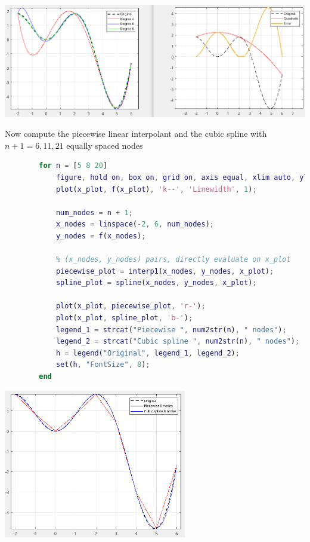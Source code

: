         \begin{center}
            \includegraphics[width=1\textwidth]{images/code_interp_lagrange.png}            
        \end{center}
        Now compute the piecewise linear interpolant and the cubic spline with $n+1=6,11,21$ equally spaced nodes
        \begin{lstlisting}[language=Matlab, escapeinside=`', gobble=8]
        % Piecewise linear interpolant and cubic spline with n+1=6,9,21 equally space nodes
        for n = [5 8 20]
            figure, hold on, box on, grid on, axis equal, xlim auto, ylim auto;
            plot(x_plot, f(x_plot), 'k--', 'Linewidth', 1);
        
            num_nodes = n + 1;
            x_nodes = linspace(-2, 6, num_nodes);
            y_nodes = f(x_nodes);
        
            % (x_nodes, y_nodes) pairs, directly evaluate on x_plot
            piecewise_plot = interp1(x_nodes, y_nodes, x_plot);
            spline_plot = spline(x_nodes, y_nodes, x_plot);
        
            plot(x_plot, piecewise_plot, 'r-');
            plot(x_plot, spline_plot, 'b-');
            legend_1 = strcat("Piecewise ", num2str(n), " nodes");
            legend_2 = strcat("Cubic spline ", num2str(n), " nodes");
            h = legend("Original", legend_1, legend_2);
            set(h, "FontSize", 8);
        end
        \end{lstlisting}
        \begin{center}
            \includegraphics[width=0.6\textwidth]{images/code_interp_piece_spline.png}
        \end{center}
    

